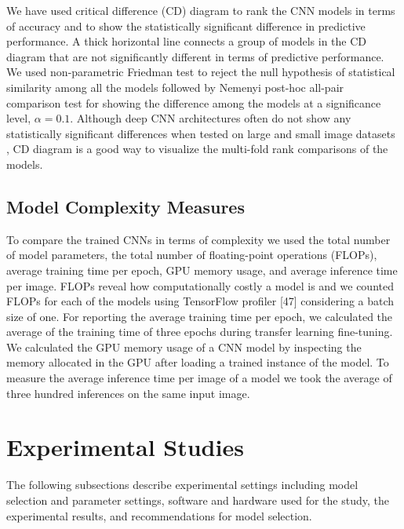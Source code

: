 We have used critical difference (CD) diagram \cite{Demsar2006} to rank the CNN models in terms of accuracy and to show the statistically significant difference in predictive performance. A thick horizontal line connects a group of models in the CD diagram that are not significantly different in terms of predictive performance. We used non-parametric Friedman test \cite{Friedman1940} to reject the null hypothesis of statistical similarity among all the models followed by Nemenyi post-hoc all-pair comparison test \cite{Nemenyi1963} for showing the difference among the models at a significance level, $\alpha=0.1$. Although deep CNN architectures often do not show any statistically significant differences when tested on large and small image datasets \cite{Burlina2020, Zoph2018, Khan_2020}, CD diagram is a good way to visualize the multi-fold rank comparisons of the models.

\subsection{Model Complexity Measures}
To compare the trained CNNs in terms of complexity we used the total number of model parameters, the total number of floating-point operations (FLOPs), average training time per epoch, GPU memory usage, and average inference time per image. FLOPs reveal how computationally costly a model is and we counted FLOPs for each of the models using TensorFlow profiler [47] considering a batch size of one.  For reporting the average training time per epoch, we calculated the average of the training time of three epochs during transfer learning fine-tuning. We calculated the GPU memory usage of a CNN model by inspecting the memory allocated in the GPU after loading a trained instance of the model. To measure the average inference time per image of a model we took the average of three hundred inferences on the same input image.

\section{Experimental Studies}\label{sec:exp_result_pretrain}
The following subsections describe experimental settings including model selection and parameter settings, software and hardware used for the study, the experimental results, and recommendations for model selection.

